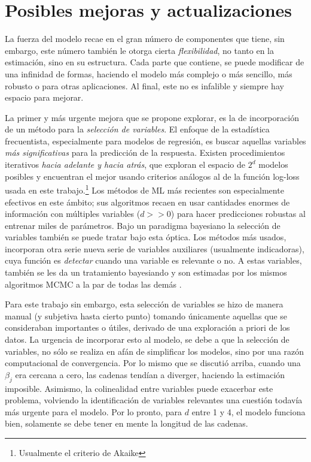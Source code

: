 \documentclass[../Main/Main.tex]{subfiles}
\begin{document}
\section{Posibles mejoras y actualizaciones}
La fuerza del modelo recae en el gran número de componentes que tiene, sin embargo, este número también le otorga cierta \textit{flexibilidad}, no tanto en la estimación, sino en su estructura. Cada parte que contiene, se puede modificar de una infinidad de formas, haciendo el modelo más complejo o más sencillo, más robusto o para otras aplicaciones. Al final, este no es infalible y siempre hay espacio para mejorar.

La primer y más urgente mejora que se propone explorar, es la de incorporación de un método para la \textit{selección de variables}. El enfoque de la estadística frecuentista, especialmente para modelos de regresión, es buscar aquellas variables \textit{más significativas} para la predicción de la respuesta. Existen procedimientos iterativos \textit{hacia adelante y hacia atrás}, que exploran el espacio de $2^d$ modelos posibles y encuentran el mejor usando criterios análogos al de la función log-loss usada en este trabajo.\footnote{Usualmente el criterio de Akaike} Los métodos de ML más recientes son especialmente efectivos en este ámbito; sus algoritmos recaen en usar cantidades enormes de información con múltiples variables ($d>>0$) para hacer predicciones robustas al entrenar miles de parámetros. Bajo un paradigma bayesiano la selección de variables también se puede tratar bajo esta óptica. Los métodos más usados, incorporan otra serie nueva serie de variables auxiliares (usualmente indicadoras), cuya función es \textit{detectar} cuando una variable es relevante o no. A estas variables, también se les da un tratamiento bayesiando y son estimadas por los mismos algoritmos MCMC a la par de todas las demás \autocite{o2009review}.

Para este trabajo sin embargo, esta selección de variables se hizo de manera manual (y subjetiva hasta cierto punto) tomando únicamente aquellas que se consideraban importantes o útiles, derivado de una exploración a priori de los datos. La urgencia de incorporar esto al modelo, se debe a que la selección de variables, no sólo se realiza en afán de simplificar los modelos, sino por una razón computacional de convergencia. Por lo mismo que se discutió arriba, cuando una $\beta_j$ era cercana a cero, las cadenas tendían a diverger, haciendo la estimación imposible. Asimismo, la colinealidad entre variables puede exacerbar este problema, volviendo la identificación de variables relevantes una cuestión todavía más urgente para el modelo. Por lo pronto, para $d$ entre 1 y 4, el modelo funciona bien, solamente se debe tener en mente la longitud de las cadenas.
\end{document}
